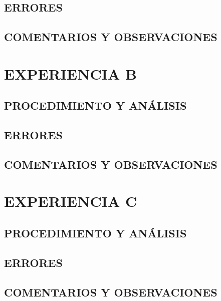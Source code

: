 \documentclass[10pt, twoside]{article}
\begin{document}
\subsection{ERRORES}%
\subsection{COMENTARIOS Y OBSERVACIONES}%

\section{EXPERIENCIA B}

\subsection{PROCEDIMIENTO Y ANÁLISIS}%
\subsection{ERRORES}%
\subsection{COMENTARIOS Y OBSERVACIONES}%

\section{EXPERIENCIA C}

\subsection{PROCEDIMIENTO Y ANÁLISIS}%
\subsection{ERRORES}%
\subsection{COMENTARIOS Y OBSERVACIONES}%
\end{document}
